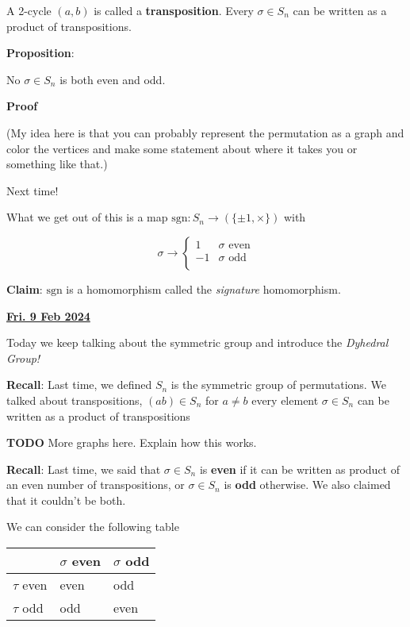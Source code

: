\documentclass[12pt]{article}
\renewcommand{\date}[1]{\underline{\bf #1}}
\def\sgn{\text{sgn}}
\def\sgn{\text{sgn}}
\newcommand{\TODO}{\color{red}\textbf{TODO}\color{black}}
\begin{document}
A 2-cycle $(a, b)$ is called a {\bf transposition}. Every $\sigma \in S_n$ can
be written as a product of transpositions.


{\bf Proposition}:

No $\sigma \in S_n$ is both even and odd.

{\bf Proof}

(My idea here is that you can probably represent the permutation as a graph and
color the vertices and make some statement about where it takes you or something
like that.)

Next time!

What we get out of this is a map $\sgn: S_n \to (\{\pm 1, \times\})$ with

\[
  \sigma \to \begin{cases}
    1 & \sigma \text{ even} \\
    -1 & \sigma \text{ odd} \\
  \end{cases}
\]

{\bf Claim}: $\sgn$ is a homomorphism called the {\it signature} homomorphism.

\date{Fri. 9 Feb 2024}

Today we keep talking about the symmetric group and introduce the {\it Dyhedral
Group!}

{\bf Recall}: Last time, we defined $S_n$ is the symmetric group of
permutations. We talked about transpositions, $(ab) \in S_n$ for $a \ne b$ every
element $\sigma \in S_n$ can be written as a product of transpositions


\TODO{} More graphs here. Explain how this works.

{\bf Recall}: Last time, we said that $\sigma \in S_n$ is {\bf even} if it can
be written as product of an even number of transpositions, or $\sigma \in S_n$
is {\bf odd} otherwise. We also claimed that it couldn't be both.

We can consider the following table

  \begin{center}
    \begin{tabular}[c]{l|l|l}
      & $\sigma$ even & $\sigma$ odd \\
      \hline
      $\tau$ even & even & odd \\
      $\tau$ odd & odd & even \\

      \hline
    \end{tabular}
  \end{center}
\end{document}
